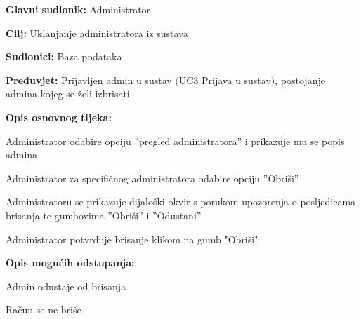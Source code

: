 \noindent {}
\begin{packed_item}

	\item \textbf{Glavni sudionik: } Administrator
	\item  \textbf{Cilj:} Uklanjanje administratora iz sustava
	\item  \textbf{Sudionici:} Baza podataka
	\item  \textbf{Preduvjet:} Prijavljen admin u sustav $($UC3 Prijava u sustav$)$, postojanje
	admina kojeg se želi izbrisati
	\item  \textbf{Opis osnovnog tijeka:}
	
	\item[] \begin{packed_enum}

		\item Administrator odabire opciju ”pregled administratora” i prikazuje mu se popis admina
		\item Administrator za specifičnog administratora odabire opciju ”Obriši”
		\item Administratoru se prikazuje dijaloški okvir s porukom upozorenja o posljedicama brisanja te gumbovima ”Obriši” i ”Odustani”
		\item Administrator potvrđuje brisanje klikom na gumb "Obriši"
	\end{packed_enum}

	\item  \textbf{Opis mogućih odstupanja:}
	
	\item[] \begin{packed_item}

		\item[4.a] Admin odustaje od brisanja
		\item[] \begin{packed_enum}
			
			\item Račun se ne briše
			
		\end{packed_enum}
		
	\end{packed_item}
	
\end{packed_item}



